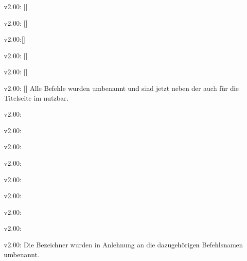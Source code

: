 \begin{Bundle}{}
\begin{Obsolete}{v2.00:}{%
  []%
}
\begin{Obsolete}{v2.00:}{%
  []%
}
\begin{Obsolete}{v2.00:}{[]}
\begin{Obsolete}{v2.00:}{%
  []%
}
\begin{Obsolete}{v2.00:}{%
  []%
}
\begin{Obsolete}{v2.00:}{%
  []%
}
\printobsoletelist%
%
Alle Befehle wurden umbenannt und sind jetzt neben der \taskname{} auch für die 
Titelseite im \CD nutzbar.
\end{Obsolete}
\end{Obsolete}
\end{Obsolete}
\end{Obsolete}
\end{Obsolete}
\end{Obsolete}

\begin{Obsolete}{v2.00:}{}
\begin{Obsolete}{v2.00:}{}
\begin{Obsolete}{v2.00:}{}
\begin{Obsolete}{v2.00:}{}
\begin{Obsolete}{v2.00:}{}
\begin{Obsolete}{v2.00:}{}
\begin{Obsolete}{v2.00:}{}
\begin{Obsolete}{v2.00:}{}
\begin{Obsolete}{v2.00:}{}
\printobsoletelist%
%
Die Bezeichner wurden in Anlehnung an die dazugehörigen Befehlsnamen umbenannt.
\end{Obsolete}
\end{Obsolete}
\end{Obsolete}
\end{Obsolete}
\end{Obsolete}
\end{Obsolete}
\end{Obsolete}
\end{Obsolete}
\end{Obsolete}
\end{Bundle}


